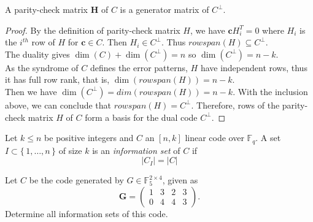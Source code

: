 \begin{proposition}
A parity-check matrix $\mathbf{H}$ of $C$ is a generator matrix of $C^\perp$. 
\end{proposition}
\begin{proof}
    By the definition of parity-check matrix $H$, we have $\mathbf{c}H_i^T=0$ where $H_i$ is the $i^{th}$ row of $H$ for $\mathbf{c}\in C$. Then $H_i\in C^\perp$. Thus $rowspan(H) \subseteq C^\perp.$\\
    The duality gives $\dim(C)+\dim(C^\perp)=n$ so $\dim(C^\perp)=n-k$.\\
    As the syndrome of $C$ defines the error patterns, $H$ have independent rows, thus it has full row rank, that is, $\dim(rowspan(H))=n-k$.\\
    Then we have $\dim(C^\perp)=dim(rowspan(H))=n-k$. With the inclusion above, we can conclude that $rowspan(H) = C^\perp$.
    Therefore, rows of the parity-check matrix $H$ of $C$ form a basis for the dual code $C^\perp$.
\end{proof}
\vspace{1.0cm}
\begin{definition}
Let $k \leq n$ be positive integers and $C$ an $[n, k]$ linear code over $\mathbb{F}_q$. A set $I \subset \{\,1, \dots, n\,\}$ of size $k$ is an \textit{information set} of $C$ if
\[
\left|C_I\right| = \left|C|\right. 
\]
\end{definition}
\begin{exmp}
Let $C$ be the code generated by $G \in \mathbb{F}_5^{2 \times 4}$, given as
\[
\mathbf{G} =
\begin{pmatrix}
1 & 3 & 2 & 3 \\
0 & 4 & 4 & 3
\end{pmatrix}.
\]
Determine all information sets of this code.
\end{exmp}
